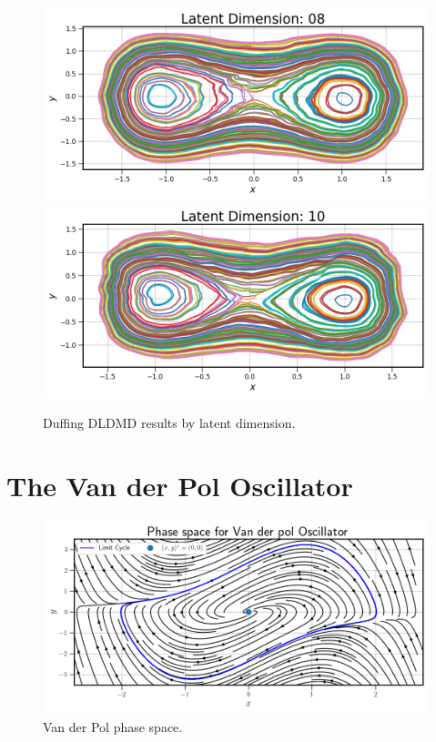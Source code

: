 \begin{figure}[!htbp]
\begin{minipage}{.5\textwidth}
        \includegraphics[width=\textwidth]{"../Figures/duffing_trajectories_08.png"} 
        \includegraphics[width=\textwidth]{"../Figures/duffing_trajectories_10.png"} 
    \end{minipage}
    \caption{Duffing DLDMD results by latent dimension.}
    \label{fig:duffing DLDMD results}
\end{figure}

\section{The Van der Pol Oscillator}
\label{section:van der pol results}

\begin{figure}[ht]
    \centering
    \begin{minipage}{\textwidth}
        \includegraphics[width=\textwidth]{"../Figures/van_der_pol_phase_space.png"} 
    \end{minipage}
    \caption{Van der Pol phase space.}
    \label{fig:van der pol phase space}
\end{figure}


